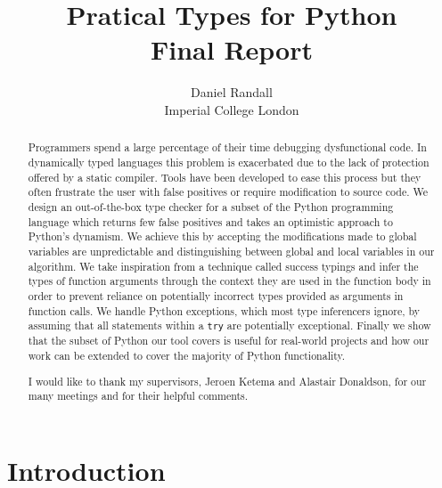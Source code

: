\documentclass[12pt, titlepage]{article}
\title{Pratical Types for Python \\ Final Report}
\author{Daniel Randall \\ Imperial College London}
\date{}
\begin{document}
\maketitle


\begin{abstract}
Programmers spend a large percentage of their time debugging dysfunctional code. In dynamically typed languages this problem is exacerbated due to the lack of protection offered by a static compiler. Tools have been developed to ease this process but they often frustrate the user with false positives or require modification to source code. We design an out-of-the-box type checker for a subset of the Python programming language which returns few false positives and takes an optimistic approach to Python's dynamism. We achieve this by accepting the modifications made to global variables are unpredictable and distinguishing between global and local variables in our algorithm. We take inspiration from a technique called success typings and infer the types of function arguments through the context they are used in the function body in order to prevent reliance on potentially incorrect types provided as arguments in function calls. We handle Python exceptions, which most type inferencers ignore, by assuming that all statements within a \texttt{try} are potentially exceptional. Finally we show that the subset of Python our tool covers is useful for real-world projects and how our work can be extended to cover the majority of Python functionality.
\end{abstract}

\renewcommand{\abstractname}{Acknowledgements}
\begin{abstract}
I would like to thank my supervisors, Jeroen Ketema and Alastair Donaldson, for our many meetings and for their helpful comments.
\end{abstract}

\tableofcontents
\newpage

\section{Introduction}
\end{document}
